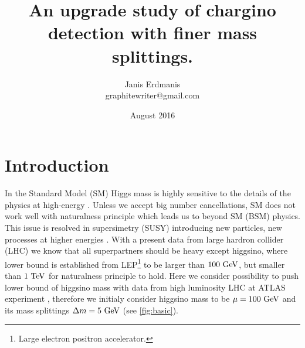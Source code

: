 \documentclass[tightenline,notitlepage,nofootinbib]{revtex4-1}
\begin{document}
  \title{An upgrade study of chargino detection with finer mass splittings.}
  \author{Janis Erdmanis \\ graphitewriter@gmail.com}
  \date{August 2016}
  \maketitle

  \section{Introduction}

  In the Standard Model (SM) Higgs mass is highly sensitive to the details of the physics at high-energy \cite{Barbieri}. Unless we accept big number cancellations, SM does not work well with naturalness principle which leads us to beyond SM (BSM) physics. This issue is resolved in supersimetry (SUSY) introducing new particles, new processes at higher energies \cite{Carlos}. With a present data from large hardron collider (LHC) \cite{PhysRevD.93.052002} we know that all superpartners should be heavy except higgsino, where lower bound is established from LEP\footnote{Large electron positron accelerator.} to be larger than $100~\rm{GeV}$, but smaller than $1 ~\rm{TeV}$ for naturalness principle to hold. Here we consider possibility to push lower bound of higgsino mass with data from high luminosity LHC at ATLAS experiment \cite{HLLHC,ATLASCOL-2008}, therefore we initialy consider higgsino mass to be $\mu=100~\rm{GeV}$ and its mass splittings $\Delta m = 5~\rm{GeV}$ (see \cref{fig:basic}).
\end{document}
